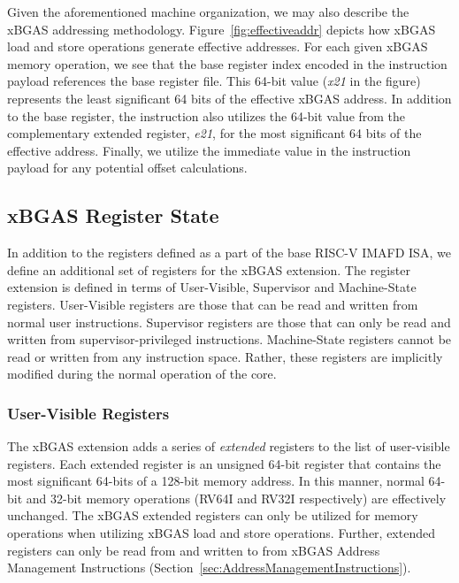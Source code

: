 \documentclass{article}
\begin{document}
Given the aforementioned machine organization, we may also describe the xBGAS addressing methodology.  
Figure~\ref{fig:effectiveaddr} depicts how xBGAS load and store operations generate effective addresses.  For each 
given xBGAS memory operation, we see that the base register index encoded in the instruction payload references 
the base register file.  This 64-bit value (\textit{x21} in the figure) represents the least significant 64 bits of the effective 
xBGAS address.  In addition to the base register, the instruction also utilizes the 64-bit value from the complementary 
extended register, \textit{e21}, for the most significant 64 bits of the effective address.  Finally, we utilize the immediate 
value in the instruction payload for any potential offset calculations.

\subsection{xBGAS Register State}
In addition to the registers defined as a part of the base RISC-V IMAFD ISA, we define an additional set of registers for the xBGAS extension.  The register extension is defined in terms of User-Visible, Supervisor and Machine-State registers.  User-Visible registers are those that can be read and written from normal user instructions.  Supervisor registers are those that can only be read and written from supervisor-privileged instructions.  Machine-State registers cannot be read or written from any instruction space.  Rather, these registers are implicitly modified during the normal operation of the core.     

\subsubsection{User-Visible Registers} 
The xBGAS extension adds a series of \emph{extended} registers to the list of user-visible registers.  Each extended register is an unsigned 64-bit register that contains the most significant 64-bits of a 128-bit memory address.  In this manner, normal 64-bit and 32-bit memory operations (RV64I and RV32I respectively) are effectively unchanged.  The xBGAS extended registers can only be utilized for memory operations when utilizing xBGAS load and store operations.  Further, extended registers can only be read from and written to from xBGAS Address Management Instructions (Section~\ref{sec:AddressManagementInstructions}).   

\begin{center}
\end{center}
\end{document}
